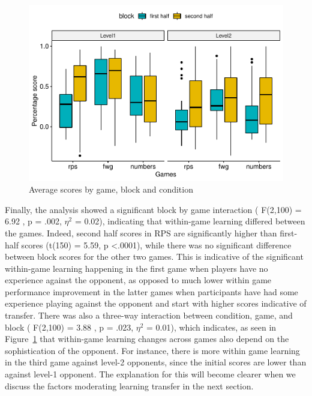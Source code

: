 \documentclass[man,floatsintext]{apa6}
\begin{document}
\begin{figure}

{\centering \includegraphics{draft_report_v3_files/figure-latex/exp1-3factor-plot-1} 

}

\caption{Average scores by game, block and condition}\label{fig:exp1-3factor-plot}
\end{figure}

Finally, the analysis showed a significant block by game interaction ( F(2,100) = 6.92 , p = .002, \(\eta^{2}\) = 0.02), indicating that within-game learning differed between the games. Indeed, second half scores in RPS are significantly higher than first-half scores (t(150) = 5.59, p \textless{}.0001), while there was no significant difference between block scores for the other two games. This is indicative of the significant within-game learning happening in the first game when players have no experience against the opponent, as opposed to much lower within game performance improvement in the latter games when participants have had some experience playing against the opponent and start with higher scores indicative of transfer. There was also a three-way interaction between condition, game, and block ( F(2,100) = 3.88 , p = .023, \(\eta^{2}\) = 0.01), which indicates, as seen in Figure~\ref{fig:exp1-3factor-plot} that within-game learning changes across games also depend on the sophistication of the opponent. For instance, there is more within game learning in the third game against level-2 opponents, since the initial scores are lower than against level-1 opponent. The explanation for this will become clearer when we discuss the factors moderating learning transfer in the next section.
\end{document}
